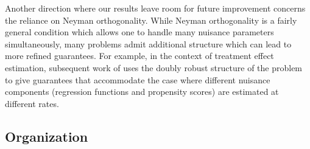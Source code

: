 \documentclass[11pt]{article} %
\theoremstyle{theorem}  %
\theoremstyle{plain}
\newenvironment{revone}{\color{black}}{\ignorespacesafterend}
\begin{document}
\begin{revone}
  Another direction where our results leave room for future improvement concerns the reliance on Neyman orthogonality. While Neyman orthogonality is a fairly general condition which allows one to handle many nuisance parameters simultaneously, many problems admit additional structure which can lead to more refined guarantees. For example, in the context of treatment effect estimation, subsequent work of \cite{kennedy2020optimal} uses the doubly robust structure of the problem to give guarantees that accommodate the case where different nuisance components (regression functions and propensity scores) are estimated at different rates.
\end{revone}

%
%

%

%

%
%

%

%

%

%

%

\subsection{Organization}
\end{document}
